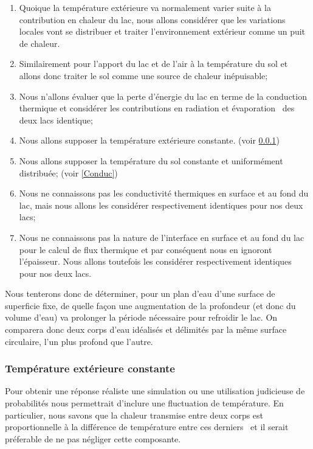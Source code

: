\documentclass[12pt]{article}
\numberwithin{figure}{section}
\begin{document}
\begin{enumerate}
    \item Quoique la temp\'erature ext\'erieure va normalement varier suite \`a la contribution
        en chaleur du lac, nous allons consid\'erer que les variations locales vont se distribuer
        et traiter l'environnement ext\'erieur comme un puit de chaleur.
    \item Similairement pour l'apport du lac et de l'air \`a la temp\'erature du sol et allons
        donc traiter le sol comme une source de chaleur in\'epuisable;
    \item Nous n'allons \'evaluer que la perte d'\'energie du lac en terme de la conduction thermique
        et consid\'erer les contributions en radiation et \'evaporation~\cite{Evap} des deux lacs
        identique;
    \item Nous allons supposer la temp\'erature ext\'erieure constante. (voir \ref{TempExt})
    \item Nous allons supposer la temp\'erature du sol constante et uniform\'ement distribu\'ee;
        (voir \ref{Conduc})
    \item Nous ne connaissons pas les conductivit\'e thermiques en surface et au fond du lac, mais
        nous allons les consid\'erer respectivement identiques pour nos deux lacs;
    \item Nous ne connaissons pas la nature de l'interface en surface et au fond du lac pour le
        calcul de flux thermique et par cons\'equent nous en ignoront l'\'epaisseur. Nous allons
        toutefois les consid\'erer respectivement identiques pour nos deux lacs.
\end{enumerate}

Nous tenterons donc de d\'eterminer, pour un plan d'eau d'une surface de superficie fixe, de quelle fa\c
con une augmentation de la profondeur (et donc du volume d'eau) va prolonger la p\'eriode n\'ecessaire
pour refroidir le lac. On comparera donc deux corps d'eau id\'ealis\'es et d\'elimit\'es par la m\^eme
surface circulaire, l'un plus profond que l'autre.

\subsubsection{Temp\'erature ext\'erieure constante}\label{TempExt}

Pour obtenir une r\'eponse r\'ealiste une simulation ou une utilisation judicieuse de probabilit\'es
nous permettrait d'inclure une fluctuation de temp\'erature. En particulier, nous savons que la
chaleur transmise entre deux corps est proportionnelle \`a la diff\'erence de temp\'erature entre
ces derniers~\cite{Fourier} et il serait pr\'eferable de ne pas n\'egliger cette composante.
\end{document}
